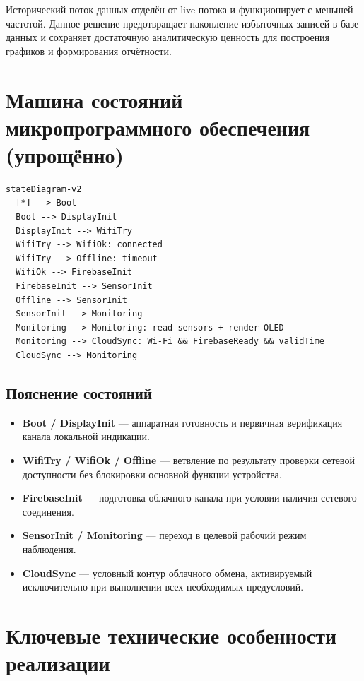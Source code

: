 Исторический поток данных отделён от live-потока и функционирует с меньшей частотой. Данное решение предотвращает накопление избыточных записей в базе данных и сохраняет достаточную аналитическую ценность для построения графиков и формирования отчётности.

\section{Машина состояний микропрограммного обеспечения (упрощённо)}

\begin{verbatim}
stateDiagram-v2
  [*] --> Boot
  Boot --> DisplayInit
  DisplayInit --> WifiTry
  WifiTry --> WifiOk: connected
  WifiTry --> Offline: timeout
  WifiOk --> FirebaseInit
  FirebaseInit --> SensorInit
  Offline --> SensorInit
  SensorInit --> Monitoring
  Monitoring --> Monitoring: read sensors + render OLED
  Monitoring --> CloudSync: Wi-Fi && FirebaseReady && validTime
  CloudSync --> Monitoring
\end{verbatim}

\subsection{Пояснение состояний}

\begin{itemize}
    \item \textbf{Boot / DisplayInit} --- аппаратная готовность и первичная верификация канала локальной индикации.
    \item \textbf{WifiTry / WifiOk / Offline} --- ветвление по результату проверки сетевой доступности без блокировки основной функции устройства.
    \item \textbf{FirebaseInit} --- подготовка облачного канала при условии наличия сетевого соединения.
    \item \textbf{SensorInit / Monitoring} --- переход в целевой рабочий режим наблюдения.
    \item \textbf{CloudSync} --- условный контур облачного обмена, активируемый исключительно при выполнении всех необходимых предусловий.
\end{itemize}

\section{Ключевые технические особенности реализации}

